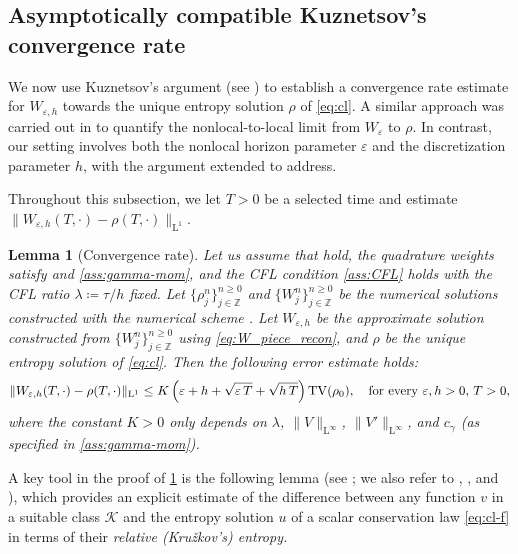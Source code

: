 \documentclass[10pt]{amsart}
\theoremstyle{plain}
\newtheorem{lemma}{Lemma}[section]
\theoremstyle{definition}
\numberwithin{equation}{section}
\newcommand{\eps}{{\varepsilon}}
\begin{document}
\subsection{Asymptotically compatible Kuznetsov's convergence rate}
\label{ssec:kuz}

We now use Kuznetsov's argument (see \cite{MR483509}) to establish a convergence rate estimate for $W_{\eps,h}$ towards the unique entropy solution $\rho$ of \cref{eq:cl}. A similar approach was carried out in \cite[Proposition~5.1 \& pp.~18--22]{MR4553943} to quantify the nonlocal-to-local limit from $W_\varepsilon$ to $\rho$. In contrast, our setting involves both the nonlocal horizon parameter $\varepsilon$ and the discretization parameter $h$, with the argument extended to address.

Throughout this subsection, we let $T>0$ be a selected time and estimate $\|W_{\eps,h}(T,\cdot)-\rho(T,\cdot)\|_{\mathrm{L}^1}$.

\begin{lemma}[Convergence rate]\label{th:rate}
Let us assume that  hold, the quadrature weights satisfy   and \cref{ass:gamma-mom}, and the CFL condition \cref{ass:CFL} holds with the CFL ratio $\lambda\coloneqq \tau/h$ fixed. Let $\{\rho_j^n\}_{j\in\mathbb{Z}}^{n\geq0}$ and $\{W_j^n\}_{j\in\mathbb{Z}}^{n\geq0}$ be the numerical solutions constructed with the numerical scheme . Let $W_{\eps,h}$ be the approximate solution constructed from $\{W_j^n\}_{j\in\mathbb{Z}}^{n\geq0}$ using \cref{eq:W_piece_recon}, and $\rho$ be the unique entropy solution of \cref{eq:cl}.
Then the following error estimate holds:
\begin{align*}
\|W_{\eps,h}(T,\cdot)-\rho(T,\cdot)\|_{\mathrm{L}^1} \leq K\left( \eps+h+\sqrt{\eps\, T}+\sqrt{h\, T} \right) \mathrm{TV}(\rho_0), \quad \textnormal{for every } \eps,h > 0, \, T > 0,
\end{align*}
where the constant $K>0$ only depends on $\lambda$, $\|V\|_{\mathrm{L}^\infty}$, $\|V'\|_{\mathrm{L}^\infty}$, and $c_\gamma$ (as specified in \cref{ass:gamma-mom}).
\end{lemma}

A key tool in the proof of \cref{th:rate} is the following lemma (see \cite{MR483509}; we also refer to \cite[Theorem 3.14]{MR3443431}, \cite[Lemma 3.2]{MR4700412}, and \cite[Lemma 2.1]{MR1825698}), which provides an explicit estimate of the difference between any function $v$ in a suitable class $\mathcal K$ and the entropy solution $u$ of a scalar conservation law \cref{eq:cl-f} in terms of their \emph{relative (Kru\v{z}kov's) entropy. 
}
\end{document}
